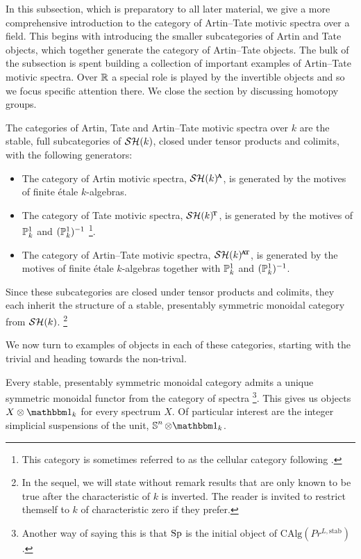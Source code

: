 In this subsection, which is preparatory to all later material, we give a more comprehensive introduction to the category of Artin--Tate motivic spectra over a field. This begins with introducing the smaller subcategories of Artin and Tate objects, which together generate the category of Artin--Tate objects. The bulk of the subsection is spent building a collection of important examples of Artin--Tate motivic spectra. Over $\R$ a special role is played by the invertible objects and so we focus specific attention there. We close the section by discussing homotopy groups.

\begin{dfn}
  The categories of Artin, Tate and Artin--Tate motivic spectra over $k$ are the stable, full subcategories of $\SHk$, closed under tensor products and colimits, with the following generators:
  \begin{itemize}
  \item The category of Artin motivic spectra, $\SHka$, is generated by the motives of finite \'etale $k$-algebras.
  \item The category of Tate motivic spectra, $\SHkt$, is generated by the motives of $\P_k^1$ and $(\P_k^1)^{-1}$ \footnote{This category is sometimes referred to as the cellular category following \cite{DICell}.}.
  \item The category of Artin--Tate motivic spectra, $\SHkat$, is generated by the motives of finite \'etale $k$-algebras together with $\P_k^1$ and $(\P_k^1)^{-1}$.
  \end{itemize}
  Since these subcategories are closed under tensor products and colimits, they each inherit the structure of a stable, presentably symmetric monoidal category from $\SHk$. \footnote{In the sequel, we will state without remark results that are only known to be true after the characteristic of $k$ is inverted. The reader is invited to restrict themself to $k$ of characteristic zero if they prefer.}
\end{dfn}

We now turn to examples of objects in each of these categories, starting with the trivial and heading towards the non-trival.

\begin{exm} \label{exm:Sp-unit}
  Every stable, presentably symmetric monoidal category admits a unique symmetric monoidal functor from the category of spectra \cite[Corollary 4.8.2.19]{HA} \footnote{Another way of saying this is that $\Sp$ is the initial object of $\mathrm{CAlg}(Pr^{L,\mathrm{stab}})$.}.
  This gives us objects $X \otimes \o_k$ for every spectrum $X$.
  Of particular interest are the integer simplicial suspensions of the unit, $\Ss^{n} \otimes \o_k$.
\end{exm}

